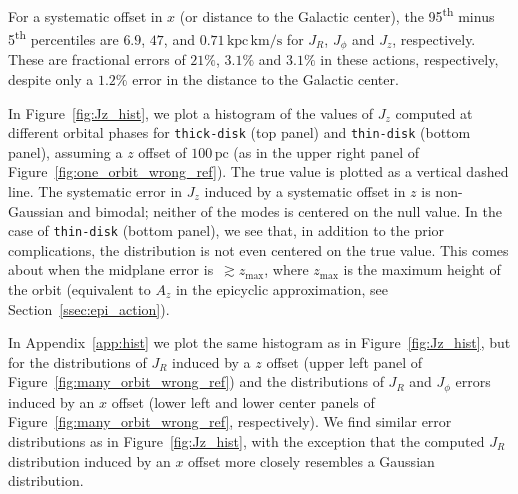 \documentclass[twocolumn]{aastex62}
\newcommand{\pc}{\text{pc}}
\newcommand{\kms}{\text{km}/\text{s}}
\newcommand{\actunit}{\text{kpc}\,\kms}
\newcommand{\thin}{\texttt{thin-disk}}
\newcommand{\thick}{\texttt{thick-disk}}
\begin{document}
For a systematic offset in $x$ (or distance to the Galactic center), the
95\textsuperscript{th} minus 5\textsuperscript{th} percentiles are $6.9$,
$47$, and $0.71\,\actunit$ for $J_R$, $J_{\phi}$ and $J_z$, respectively.
These are fractional errors of $21\%$, $3.1\%$ and $3.1\%$ in these actions, respectively, despite only a $1.2\%$ error in the distance to the Galactic center.

In Figure~\ref{fig:Jz_hist}, we plot a histogram of the values of
$J_z$ computed at different orbital phases for \thick{} (top panel) and \thin{} (bottom panel),
assuming a $z$ offset of $100\,\pc$ (as in the upper right panel of
Figure~\ref{fig:one_orbit_wrong_ref}). The true value is plotted as a
vertical dashed line. The systematic error in $J_z$ induced by a
systematic offset in $z$ is non-Gaussian and bimodal; neither of the modes is centered on the null value. In the case of \thin{}
(bottom panel), we see that, in addition to the prior complications, the
distribution is not even centered on the true value. This comes about when the midplane
error is~$\gtrsim z_{\text{max}}$, where $z_{\text{max}}$ is the maximum
height of the orbit (equivalent to $A_z$ in the epicyclic approximation, see
Section~\ref{ssec:epi_action}).

In Appendix~\ref{app:hist} we plot the same histogram as in
Figure~\ref{fig:Jz_hist}, but for the distributions of $J_R$ induced
by a $z$ offset (upper left panel of Figure~\ref{fig:many_orbit_wrong_ref})
and the distributions of $J_R$ and $J_{\phi}$ errors induced by an
$x$ offset (lower left and lower center panels of
Figure~\ref{fig:many_orbit_wrong_ref}, respectively). We find similar error
distributions as in Figure~\ref{fig:Jz_hist}, with the exception that the
computed $J_R$ distribution induced by an $x$ offset more closely resembles a
Gaussian distribution.
\end{document}
